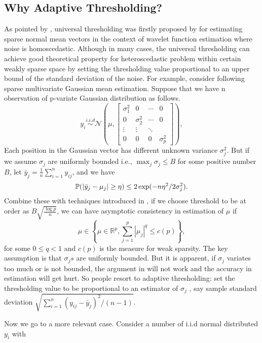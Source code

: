 \subsection{Why Adaptive Thresholding?}
As pointed by \cite{cai2011adaptive}, universal thresholding was firstly proposed by \cite{donoho1994ideal} for estimating sparse normal mean vectors in the context of wavelet function estimation where noise  is homoscedastic. Although in many cases, the universal thresholding can achieve good theoretical property for heteroscedastic problem within certain weakly sparse space by setting the thresholding value proportional to an upper bound of the standard deviation of the noise.  For example, consider following sparse multivariate Gaussian mean estimation. Suppose that we have n observation of p-variate Gaussian distribution as follows. 
\[
y_i \overset{i.i.d}{\sim} \mathcal{N}\left(\mu, 
\begin{bmatrix}
\sigma^2_1 & 0 & \cdots & 0\\  
0 & \sigma^2_2 & \cdots & 0\\
\vdots & \vdots & \ddots\\
0 & 0& 0& \sigma^2_p
\end{bmatrix}\right),
\]
Each position in the Gaussian vector has different unknown variance $\sigma_j^2$. But if we assume $ \sigma_j$ are uniformly bounded i.e., $\max_j \sigma_j\le B$ for some positive number $B$, 
let $\bar{y}_j = \frac{1}{n}\sum_{i=1}^n y_{ij}$,  and we have 
\begin{equation}
\mathbb{P}( |\bar{y}_j  - \mu_j |\ge \eta)\le 2 \exp(-n\eta^2/2\sigma_j^2). 
\end{equation} 
Combine these with techniques introduced in \cite{bickel2008covariance}, if we choose 
threshold to be at order as $B\sqrt{\frac{\log p}{n}}$, we can have asymptotic consistency in estimation of $\mu$ if 
\[
\mu \in \left\{\mu \in \mathbb{R}^p, \sum_{j=1}^p |\mu_j|^q \le c(p)\right\}, 
\]
for some $0\le q<1$ and $c(p)$ is the measure for weak sparsity. The key assumption is that $\sigma_js$ are uniformly bounded. But it is apparent, if $\sigma_j$ variates too much or is not bounded, the argument in \cite{bickel2008covariance} will not work and the accuracy in estimation will get hurt.  So people resort to adaptive thresholding: set the thresholding value to be proportional to an estimator of $\sigma_j$ , say sample standard deviation $\sqrt{\sum_{i=1}^n (y_{ij} - \bar{y}_j)^2/(n-1)}$.  \par 
 Now we go to a more relevant case. 
Consider a number of i.i.d normal distributed $y_i$ with 
